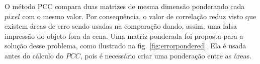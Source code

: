 O método PCC compara duas matrizes de mesma dimensão ponderando cada $pixel$ com o mesmo valor. 
Por consequência, o valor de correlação reduz visto que existem áreas de erro sendo usadas na comparação
dando, assim, uma falsa impressão do objeto fora da cena. 
Uma matriz ponderada foi proposta para a solução desse problema, como ilustrado na fig. \ref{fig:errorpondered}. 
Ela é usada antes do cálculo do $PCC$, pois é necessário criar uma ponderação entre as áreas.

